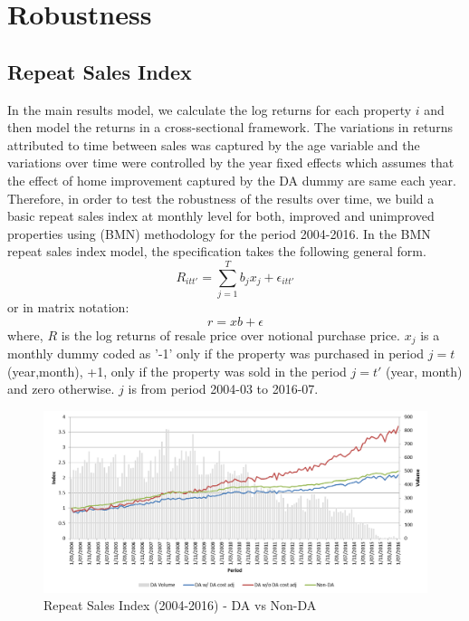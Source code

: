 \documentclass{article}
\begin{document}
\section{Robustness}

\subsection{Repeat Sales Index}

In the main results model, we calculate the log returns for each property $i$ and then model the returns in a cross-sectional framework. The variations in returns attributed to time between sales was captured by the age variable and the variations over time were controlled by the year fixed effects which assumes that the effect of home improvement captured by the DA dummy are same each year. Therefore, in order to test the robustness of the results over time, we build a basic repeat sales index at monthly level for both, improved and unimproved properties using \citet{bailey1963regression} (BMN) methodology for the period 2004-2016. In the BMN repeat sales index model, the specification takes the following general form.
\begin{equation}
    R_{itt'} = \sum\limits_{j=1}^{T} b_jx_j + \epsilon_{itt'}  
\end{equation}
or in matrix notation: $$r = xb + \epsilon$$
where, $R$ is the log returns of resale price over notional purchase price. $x_j$ is a monthly dummy coded as '-1' only if the property was purchased in period $j = t$ (year,month), +1, only if the property was sold in the period $j = t'$ (year, month) and zero otherwise. $j$ is from period 2004-03 to 2016-07. 
\begin{figure}[!htb]
    \centering
     \includegraphics[width=\columnwidth]{Figures/Repeat_sales_index_post_2004_notional_purchase.png}
 \caption{Repeat Sales Index (2004-2016) - DA vs Non-DA}
 \label{fig:BMN_RS_index_post_2004}
\end{figure}
\end{document}
